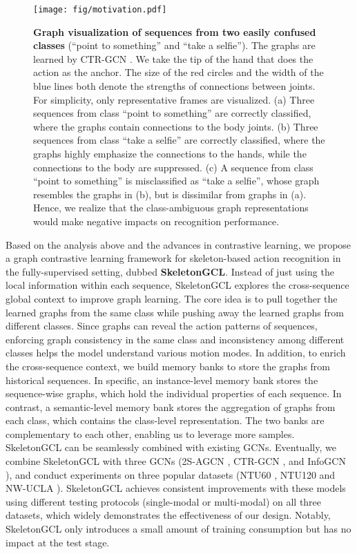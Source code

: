 \documentclass{article} \usepackage{iclr2023_conference,times}
\begin{document}
\begin{figure}
    \centering
    \texttt{[image: fig/motivation.pdf]}
    \caption{\textbf{Graph visualization of sequences from two easily confused classes }(``point to something'' and ``take a selfie''). The graphs are learned by CTR-GCN \citep{CTRGCN}. We take the tip of the hand that does the action as the anchor. The size of the red circles and the width of the blue lines both denote the strengths of connections between joints. For simplicity, only representative frames are visualized. (a) Three sequences from class ``point to something'' are correctly classified, where the graphs contain connections to the body joints. (b) Three sequences from class ``take a selfie'' are correctly classified, where the graphs highly emphasize the connections to the hands, while the connections to the body are suppressed. (c) A sequence from class ``point to something'' is misclassified as ``take a selfie'', whose graph resembles the graphs in (b), but is dissimilar from graphs in (a). Hence, we realize that the class-ambiguous graph representations would make negative impacts on recognition performance.}
    \label{fig:motivation}
\end{figure}

Based on the analysis above and the advances in contrastive learning, we propose a graph contrastive learning framework for skeleton-based action recognition in the fully-supervised setting, dubbed \textbf{SkeletonGCL}. Instead of just using the local information within each sequence, SkeletonGCL explores the cross-sequence global context to improve graph learning. The core idea is to pull together the learned graphs from the same class while pushing away the learned graphs from different classes. Since graphs can reveal the action patterns of sequences, enforcing graph consistency in the same class and inconsistency among different classes helps the model understand various motion modes. In addition, to enrich the cross-sequence context, we build memory banks to store the graphs from historical sequences. In specific, an instance-level memory bank stores the sequence-wise graphs, which hold the individual properties of each sequence. In contrast, a semantic-level memory bank stores the aggregation of graphs from each class, which contains the class-level representation. The two banks are complementary to each other, enabling us to leverage more samples. SkeletonGCL can be seamlessly combined with existing GCNs. 
Eventually, we combine SkeletonGCL with three GCNs (2S-AGCN \citep{2SAGCN}, CTR-GCN \citep{CTRGCN}, and InfoGCN \citep{INFOGCN}), and conduct experiments on three popular datasets (NTU60 \citep{ntu60}, NTU120 \citep{ntu120} and NW-UCLA \citep{nw-ucla}). SkeletonGCL achieves consistent improvements with these models using different testing protocols (single-modal or multi-modal) on all three datasets, which widely demonstrates the effectiveness of our design. Notably, SkeletonGCL only introduces a small amount of training consumption but has no impact at the test stage.
\end{document}
